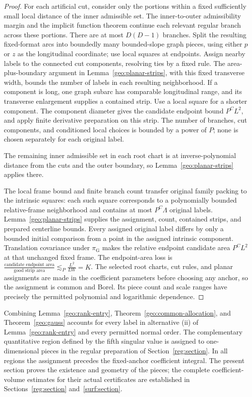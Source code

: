 \documentclass[11pt]{amsart}
\theoremstyle{definition}
\theoremstyle{remark}
\numberwithin{equation}{section}
\begin{document}
\begin{proof}
For each artificial cut, consider only the portions within a fixed sufficiently small local distance of the inner admissible set. The inner-to-outer admissibility margin and the implicit function theorem continue each relevant regular branch across these portions. There are at most $D(D-1)$ branches. Split the resulting fixed-format arcs into boundedly many bounded-slope graph pieces, using either $p$ or $z$ as the longitudinal coordinate; use local squares at endpoints. Assign nearby labels to the connected cut components, resolving ties by a fixed rule. The area-plus-boundary argument in Lemma~\ref{geo:planar-strips}, with this fixed transverse width, bounds the number of labels in each resulting neighborhood. If a component is long, one graph subarc has comparable longitudinal range, and its transverse enlargement supplies a contained strip. Use a local square for a shorter component. The component diameter gives the candidate endpoint bound $P^CL^2$, and apply finite derivative preparation on this strip. The number of branches, cut components, and conditioned local choices is bounded by a power of $P$; none is chosen separately for each original label.

The remaining inner admissible set in each root chart is at inverse-polynomial distance from the cuts and the outer boundary, so Lemma~\ref{geo:planar-strips} applies there.

The local frame bound and finite branch count transfer original family packing to the intrinsic squares: each such square corresponds to a polynomially bounded relative-frame neighborhood and contains at most $P^C\Lambda$ original labels. Lemma~\ref{geo:planar-strips} supplies the assignment, count, contained strips, and prepared centerline bounds. Every assigned original label differs by only a bounded initial comparison from a point in the assigned intrinsic component. Translation covariance under $\pi_{\mathrm G}$ makes the relative endpoint candidate area $P^CL^2$ at that unchanged fixed frame. The endpoint-area loss is $\frac{\text{candidate endpoint area}}{\text{good strip area}}\lesssim_P\frac{L^2}{LW}=K$. The selected root charts, cut rules, and planar assignments are made in the coefficient parameters before choosing any anchor, so the assignment is common and Borel. Its piece count and scale ranges have precisely the permitted polynomial and logarithmic dependence.
\end{proof}

Combining Lemma~\ref{geo:rank-entry}, Theorem~\ref{geo:common-allocation}, and Theorem~\ref{geo:gauss} accounts for every label in alternative \textup{(ii)} of Lemma~\ref{geo:rank-entry} and every permitted normal order. The complementary quantitative region defined by the fifth singular value is assigned to one-dimensional pieces in the regular preparation of Section~\ref{reg:section}. In all regions the assignment precedes the fixed-anchor coefficient integral. The present section proves the existence and geometry of the pieces; the complete coefficient-volume estimates for their actual certificates are established in Sections~\ref{reg:section} and~\ref{surf:section}.
\end{document}
